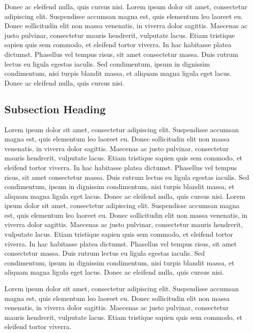 \documentclass{Format_page}
\begin{document}
Donec ac eleifend nulla, quis cursus nisi. Lorem ipsum dolor sit amet, consectetur adipiscing elit. Suspendisse accumsan magna est, quis elementum leo laoreet eu. Donec sollicitudin elit non massa venenatis, in viverra dolor sagittis. Maecenas ac justo pulvinar, consectetur mauris hendrerit, vulputate lacus. Etiam tristique sapien quis sem commodo, et eleifend tortor viverra. In hac habitasse platea dictumst. Phasellus vel tempus risus, sit amet consectetur massa. Duis rutrum lectus eu ligula egestas iaculis. Sed condimentum, ipsum in dignissim condimentum, nisi turpis blandit massa, et aliquam magna ligula eget lacus. Donec ac eleifend nulla, quis cursus nisi.
\newpage

\subsection{Subsection Heading}

Lorem ipsum dolor sit amet, consectetur adipiscing elit. Suspendisse accumsan magna est, quis elementum leo laoreet eu. Donec sollicitudin elit non massa venenatis, in viverra dolor sagittis. Maecenas ac justo pulvinar, consectetur mauris hendrerit, vulputate lacus. Etiam tristique sapien quis sem commodo, et eleifend tortor viverra. In hac habitasse platea dictumst. Phasellus vel tempus risus, sit amet consectetur massa. Duis rutrum lectus eu ligula egestas iaculis. Sed condimentum, ipsum in dignissim condimentum, nisi turpis blandit massa, et aliquam magna ligula eget lacus. Donec ac eleifend nulla, quis cursus nisi. Lorem ipsum dolor sit amet, consectetur adipiscing elit. Suspendisse accumsan magna est, quis elementum leo laoreet eu. Donec sollicitudin elit non massa venenatis, in viverra dolor sagittis. Maecenas ac justo pulvinar, consectetur mauris hendrerit, vulputate lacus. Etiam tristique sapien quis sem commodo, et eleifend tortor viverra. In hac habitasse platea dictumst. Phasellus vel tempus risus, sit amet consectetur massa. Duis rutrum lectus eu ligula egestas iaculis. Sed condimentum, ipsum in dignissim condimentum, nisi turpis blandit massa, et aliquam magna ligula eget lacus. Donec ac eleifend nulla, quis cursus nisi.


\acknowledgments 
Lorem ipsum dolor sit amet, consectetur adipiscing elit. Suspendisse accumsan magna est, quis elementum leo laoreet eu. Donec sollicitudin elit non massa venenatis, in viverra dolor sagittis. Maecenas ac justo pulvinar, consectetur mauris hendrerit, vulputate lacus. Etiam tristique sapien quis sem commodo, et eleifend tortor viverra.
\end{document}
